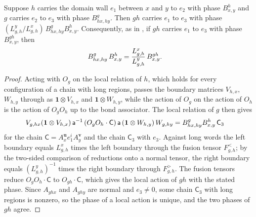 \begin{lemma}
    \label{thm:mpug_domain_wall_pentagon}
    \leanok
    Suppose $h$ carries the domain wall $e_1$ between $x$ and $y$ to $e_2$
    with phase $B^h_{x,y}$ and $g$ carries $e_2$ to $e_3$ with phase
    $B^g_{hx,hy}$. Then $gh$ carries $e_1$ to $e_3$ with phase
    $(L^y_{g,h}/L^x_{g,h})\,B^g_{hx,hy}B^h_{x,y}$. Consequently, as in
    \cite[Section~IV.B]{GarreRubioSchuch2024DomainWall}, if $gh$
    carries $e_1$ to $e_3$ with phase $B^{gh}_{x,y}$, then
    \begin{align}
        B^g_{hx,hy}\,B^h_{x,y}
         & =\frac{L^x_{g,h}}{L^y_{g,h}}\,B^{gh}_{x,y}.
        \notag
    \end{align}
\end{lemma}

\begin{proof}\leanok
    Acting with $O_g$ on the local relation of $h$, which holds for every
    configuration of a chain with long regions, passes the boundary matrices
    $V_{h,x}$, $W_{h,y}$ through as $\mathbf 1\otimes V_{h,x}$ and
    $\mathbf 1\otimes W_{h,y}$, while the action of $O_g$ on the action of
    $O_h$ is the action of $O_gO_h$ up to the bond associator. The local
    relation of $g$ then gives
    \begin{align}
        V_{g,hx}(\mathbf 1\otimes V_{h,x})\,\mathsf a^{-1}\,
        (O_gO_h\cdot\mathsf C)\,\mathsf a\,(\mathbf 1\otimes W_{h,y})\,W_{g,hy}
         & =B^g_{hx,hy}B^h_{x,y}\,\mathsf C_3
        \notag
    \end{align}
    for the chain $\mathsf C=A_x^{\mathbf u}e_1^iA_y^{\mathbf v}$ and the chain
    $\mathsf C_3$ with $e_3$. Against long words the left boundary equals
    $L^x_{g,h}$ times the left boundary through the fusion tensor
    $F^<_{g,h}$; by the two-sided comparison of reductions onto a normal
    tensor, the right boundary equals $(L^y_{g,h})^{-1}$ times the right
    boundary through $F^>_{g,h}$. The fusion tensors reduce
    $O_gO_h\cdot\mathsf C$ to $O_{gh}\cdot\mathsf C$, which gives the local
    action of $gh$ with the stated phase. Since $A_{ghx}$ and $A_{ghy}$ are
    normal and $e_3\neq0$, some chain $\mathsf C_3$ with long regions is
    nonzero, so the phase of a local action is unique, and the two phases of
    $gh$ agree.
\end{proof}

